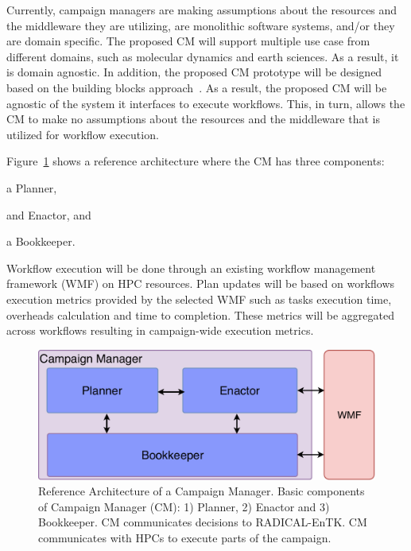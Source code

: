 Currently, campaign managers are making assumptions about the resources and the middleware they are utilizing, are monolithic software systems, and/or they are domain specific.
The proposed CM will support multiple use case from different domains, such as molecular dynamics and earth sciences.
As a result, it is domain agnostic.
In addition, the proposed CM prototype will be designed based on the building blocks approach~\cite{turilli2019middleware}.
As a result, the proposed CM will be agnostic of the system it interfaces to execute workflows.
This, in turn, allows the CM to make no assumptions about the resources and the middleware that is utilized for workflow execution.

Figure~\ref{fig:refarch} shows a reference architecture where the CM has three components:
\begin{inparaenum}[(1)]
\item a Planner,
\item and Enactor, and
\item a Bookkeeper. 
\end{inparaenum}
Workflow execution will be done through an existing workflow management framework (WMF) on HPC resources.
Plan updates will be based on workflows execution metrics provided by the selected WMF such as tasks execution time, overheads calculation and time to completion.
These metrics will be aggregated across workflows resulting in campaign-wide execution metrics.

\begin{figure}[t]
    \centering
    \includegraphics[width=.95\textwidth]{figures/CEM_design.pdf}
    \caption{Reference Architecture of a Campaign Manager. Basic 
    components of Campaign Manager (CM): 1) Planner, 2) Enactor and 3) Bookkeeper. 
    CM communicates decisions to RADICAL-EnTK. CM communicates with HPCs to 
    execute parts of the campaign.}\label{fig:refarch}
\end{figure}

